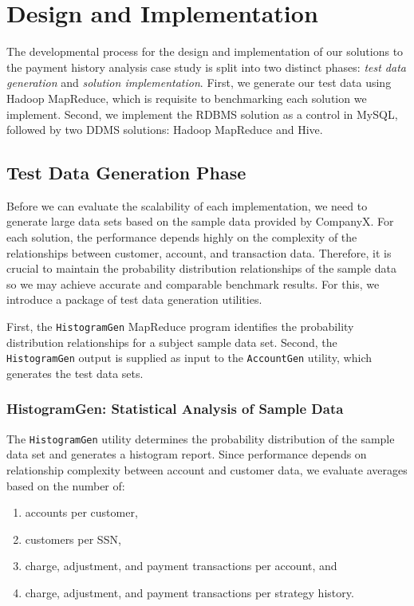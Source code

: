 %
%
\chapter{Design and Implementation} \label{ch:solution}
The developmental process for the design and implementation of our solutions to the payment history analysis case study is split into two distinct phases: \textit{test data generation} and \textit{solution implementation}. First, we generate our test data using Hadoop MapReduce, which is requisite to benchmarking each solution we implement. Second, we implement the RDBMS solution as a control in MySQL, followed by two DDMS solutions: Hadoop MapReduce and Hive.

\section{Test Data Generation Phase}
Before we can evaluate the scalability of each implementation, we need to generate large data sets based on the sample data provided by CompanyX. For each solution, the performance depends highly on the complexity of the relationships between customer, account, and transaction data. Therefore, it is crucial to maintain the probability distribution relationships of the sample data so we may achieve accurate and comparable benchmark results. For this, we introduce a package of test data generation utilities.

First, the \texttt{HistogramGen} MapReduce program identifies the probability distribution relationships for a subject sample data set. Second, the \texttt{HistogramGen} output is supplied as input to the \texttt{AccountGen} utility, which generates the test data sets.

\subsection{HistogramGen: Statistical Analysis of Sample Data}
The \texttt{HistogramGen} utility determines the probability distribution of the sample data set and generates a histogram report. Since performance depends on relationship complexity between account and customer data, we evaluate averages based on the number of:
\begin{enumerate}
 \item accounts per customer,
 \item customers per SSN,
 \item charge, adjustment, and payment transactions per account, and
 \item charge, adjustment, and payment transactions per strategy history.
\end{enumerate}

